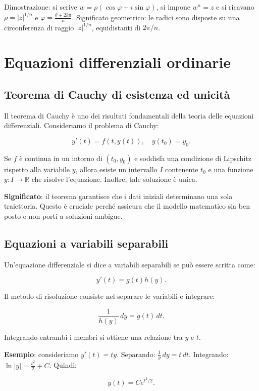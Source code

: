 \documentclass[a4paper,12pt]{article}
\begin{document}
Dimostrazione: si scrive $w=\rho(\cos\varphi+i\sin\varphi)$, si impone $w^n=z$ e si ricavano $\rho=|z|^{1/n}$ e $\varphi=\frac{\theta+2k\pi}{n}$.  
Significato geometrico: le radici sono disposte su una circonferenza di raggio $|z|^{1/n}$, equidistanti di $2\pi/n$.

\section{Equazioni differenziali ordinarie}

\subsection{Teorema di Cauchy di esistenza ed unicità}
Il teorema di Cauchy è uno dei risultati fondamentali della teoria delle equazioni differenziali.  
Consideriamo il problema di Cauchy:


\[
y'(t) = f(t,y(t)), \quad y(t_0) = y_0.
\]


Se $f$ è continua in un intorno di $(t_0,y_0)$ e soddisfa una condizione di Lipschitz rispetto alla variabile $y$, allora esiste un intervallo $I$ contenente $t_0$ e una funzione $y:I\to\mathbb{R}$ che risolve l’equazione. Inoltre, tale soluzione è unica.  

\textbf{Significato}: il teorema garantisce che i dati iniziali determinano una sola traiettoria. Questo è cruciale perché assicura che il modello matematico sia ben posto e non porti a soluzioni ambigue.

\subsection{Equazioni a variabili separabili}
Un'equazione differenziale si dice a variabili separabili se può essere scritta come:


\[
y'(t) = g(t)h(y).
\]


Il metodo di risoluzione consiste nel separare le variabili e integrare:


\[
\frac{1}{h(y)}\,dy = g(t)\,dt.
\]


Integrando entrambi i membri si ottiene una relazione tra $y$ e $t$.  

\textbf{Esempio}: consideriamo $y'(t) = t y$.  
Separando: $\frac{1}{y}\,dy = t\,dt$.  
Integrando: $\ln|y| = \frac{t^2}{2} + C$.  
Quindi:


\[
y(t) = Ce^{t^2/2}.
\]
\end{document}
